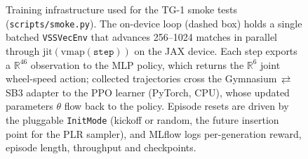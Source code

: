 \begin{figure}[ht]
{%
    }
    \caption{Training infrastructure used for the TG-1 smoke tests
    (\texttt{scripts/smoke.py}).  The on-device loop (dashed box) holds a single
    batched \texttt{VSSVecEnv} that advances 256--1024 matches in parallel through
    $\mathrm{jit}(\mathrm{vmap}(\texttt{step}))$ on the JAX device.  Each step
    exports a $\mathbb{R}^{46}$ observation to the MLP policy, which returns the
    $\mathbb{R}^{6}$ joint wheel-speed action; collected trajectories cross the
    Gymnasium\,$\rightleftarrows$\,SB3 adapter to the PPO learner (PyTorch, CPU),
    whose updated parameters $\theta$ flow back to the policy.  Episode resets are
    driven by the pluggable \texttt{InitMode} (kickoff or random, the future
    insertion point for the PLR sampler), and MLflow logs per-generation reward,
    episode length, throughput and checkpoints.}
    \label{fig:training_infra}
\end{figure}
